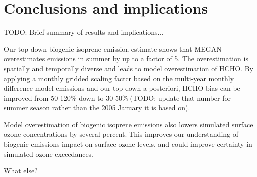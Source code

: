     
    
\section{Conclusions and implications}
  \label{BioIsop:conclusions}
  TODO: Brief summary of results and implications...
  
  Our top down biogenic isoprene emission estimate shows that MEGAN overestimates emissions in summer by up to a factor of 5.
  The overestimation is spatially and temporally diverse and leads to model overestimation of HCHO.
  By applying a monthly gridded scaling factor based on the multi-year monthly difference model emissions and our top down a posteriori, HCHO bias can be improved from 50-120\% down to 30-50\% (TODO: update that number for summer season rather than the 2005 January it is based on).
  
  Model overestimation of biogenic isoprene emissions also lowers simulated surface ozone concentrations by several percent.
  This improves our understanding of biogenic emissions impact on surface ozone levels, and could improve certainty in simulated ozone exceedances.
  
  What else?



%  
  